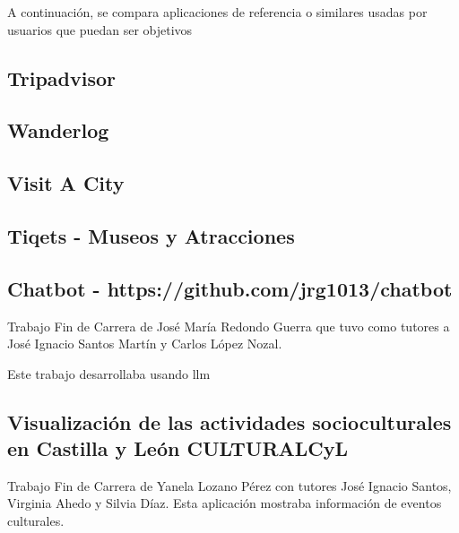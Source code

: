 
A continuación, se compara aplicaciones de referencia o similares usadas por usuarios que puedan ser objetivos
\subsection{Tripadvisor}
\subsection{Wanderlog}
\subsection{Visit A City}
\subsection{Tiqets - Museos y Atracciones}

\subsection{Chatbot - https://github.com/jrg1013/chatbot }
Trabajo Fin de Carrera de José María Redondo Guerra que tuvo como tutores a José Ignacio Santos Martín y Carlos López Nozal.

Este trabajo desarrollaba usando \acrfull{llm} 

\subsection{Visualización de las actividades socioculturales en Castilla y León CULTURALCyL}
Trabajo Fin de Carrera de Yanela Lozano Pérez con tutores José Ignacio Santos, Virginia Ahedo y Silvia Díaz.
Esta aplicación mostraba información de eventos culturales.